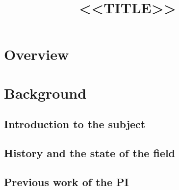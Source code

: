 \documentclass[11pt]{amsart}
\theoremstyle{plain}
\theoremstyle{definition}
\newtheorem{definition}[theorem]{Definition}
\numberwithin{equation}{section}
\begin{document}
\title[<<SHORT_TITLE>>]{<<TITLE>>}
\maketitle
\vspace{-1cm}

\section{Overview}\label{S:overview}

\section{Background}\label{S:background}
\subsection{Introduction to the subject}

\subsection{History and the state of the field}

\subsection{Previous work of the PI}
\end{document}
